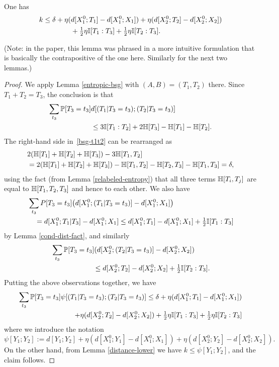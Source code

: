 \begin{lemma}\label{construct-good-prelim}
  \leanok
  One has
  \begin{align*}  k \leq
    \delta + \eta (& d[X^0_1;T_1]-d[X^0_1;X_1])
      + \eta (d[X^0_2;T_2]-d[X^0_2;X_2]) \\ & + \tfrac12 \eta \mathbb{I}[T_1:T_3] + \tfrac12 \eta \mathbb{I}[T_2:T_3].
  \end{align*}
\end{lemma}

(Note: in the paper, this lemma was phrased in a more intuitive formulation that is basically the contrapositive of the one here. Similarly for the next two lemmas.)

\begin{proof}\leanok
  We apply Lemma \ref{entropic-bsg} with $(A,B) = (T_1, T_2)$ there.
  Since $T_1 + T_2 = T_3$, the conclusion is that
  \begin{align} \nonumber \sum_{t_3} \mathbb{P}[T_3 = t_3] & d[(T_1 | T_3 = t_3); (T_2 | T_3 = t_3)] \\ & \leq 3 \mathbb{I}[T_1 : T_2] + 2 \mathbb{H}[T_3] - \mathbb{H}[T_1] - \mathbb{H}[T_2].\label{bsg-t1t2}
  \end{align}
  The right-hand side in~\eqref{bsg-t1t2} can be rearranged as
  \begin{align*} & 2( \mathbb{H}[T_1] + \mathbb{H}[T_2] + \mathbb{H}[T_3]) - 3 \mathbb{H}[T_1,T_2] \\ & = 2(\mathbb{H}[T_1] + \mathbb{H}[T_2] + \mathbb{H}[T_3]) - \mathbb{H}[T_1,T_2] - \mathbb{H}[T_2,T_3] - \mathbb{H}[T_1, T_3] = \delta,\end{align*}
  using the fact (from Lemma \ref{relabeled-entropy}) that all three terms $\mathbb{H}[T_i,T_j]$ are equal to $\mathbb{H}[T_1,T_2,T_3]$ and hence to each other.
  We also have
  \begin{align*}
  &  \sum_{t_3} P[T_3 = t_3] \bigl(d[X^0_1; (T_1 | T_3=t_3)] - d[X^0_1;X_1]\bigr) \\
  &\quad = d[X^0_1; T_1 | T_3] - d[X^0_1;X_1] \leq d[X^0_1;T_1] - d[X^0_1;X_1] + \tfrac{1}{2} \mathbb{I}[T_1 : T_3]
  \end{align*}
  by Lemma \ref{cond-dist-fact}, and similarly
  \begin{align*}
  &  \sum_{t_3} \mathbb{P}[T_3 = t_3] (d[X^0_2;(T_2 | T_3=t_3)] - d[X^0_2; X_2]) \\
  &\quad\quad\quad\quad\quad\quad \leq d[X^0_2;T_2] - d[X^0_2;X_2] + \tfrac{1}{2} \mathbb{I}[T_2 : T_3].
  \end{align*}
  Putting the above observations together, we have
  \begin{align*}
   \sum_{t_3} \mathbb{P}[T_3=t_3] \psi[(T_1 | T_3=t_3); (T_2 | T_3=t_3)] \leq \delta + \eta (d[X^0_1;T_1]-d[X^0_1;X_1]) \\
     + \eta (d[X^0_2;T_2]-d[X^0_2;X_2]) + \tfrac12 \eta \mathbb{I}[T_1:T_3] + \tfrac12 \eta \mathbb{I}[T_2:T_3]
   \end{align*}
where we introduce the notation
\[\psi[Y_1; Y_2] := d[Y_1;Y_2] +  \eta (d[X_1^0;Y_1] - d[X_1^0;X_1]) + \eta(d[X_2^0;Y_2] - d[X_2^0;X_2]).\]
On the other hand, from Lemma \ref{distance-lower} we have $k \leq \psi[Y_1;Y_2]$, and the claim follows.
  \end{proof}


